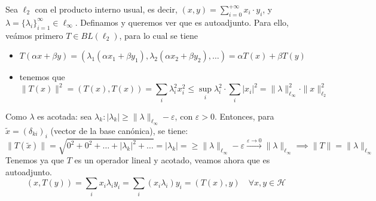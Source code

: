 \begin{ejemplo}
    Sea $\ell_2$ con el producto interno usual, es decir, $(x, y) = \sum\limits_{i=0}^{+\infty} x_i \cdot y_i$, y $\lambda = \{\lambda_i\}_{i=1}^\infty \in \ell_\infty$. Definamos 
    y queremos ver que es autoadjunto. Para ello, veámos primero $T\in BL(\ell_2)$, para lo cual se tiene
    \begin{itemize}
        \item {} $T(\alpha x + \beta y) = (\lambda_1 (\alpha x_1 + \beta y_1), \lambda_2 (\alpha x_2 + \beta y_2), \dots) = \alpha T(x) + \beta T(y)$
        \item {} tenemos que 
        \begin{equation*}
            \|T(x)\|^2 = (T(x), T(x)) = \sum_i \lambda_i^2 x_i^2 \le \sup_i \lambda_i^2 \cdot \sum_i |x_i|^2 = \|\lambda\|_{\ell_\infty}^2 \cdot \|x\|_{\ell_2}^2
        \end{equation*}
    \end{itemize}
    Como $\lambda$ es acotada: sea $\lambda_k : |\lambda_k| \ge \|\lambda\|_{\ell_\infty} - \varepsilon$, con $\varepsilon > 0$. Entonces, para $\tilde{x} = (\delta_{ki})_i$ (vector de la base canónica), se tiene:
    \[ \|T(\tilde{x})\| = \sqrt{0^2 + 0^2 + \dots + |\lambda_k|^2 + \dots} = |\lambda_k|= \ge \|\lambda\|_{\ell_\infty} - \varepsilon \xrightarrow{\varepsilon \to 0} \|\lambda\|_{\ell_\infty} \implies \|T\| = \|\lambda\|_{\ell_\infty} \]
    Tenemos ya que $T$ es un operador lineal y acotado, veamos ahora que es autoadjunto.
    \[ (x, T(y)) = \sum_i x_i \lambda_i y_i = \sum_i (x_i \lambda_i) y_i = (T(x), y) \quad \forall x, y \in \mathcal{H} \]

\end{ejemplo}


